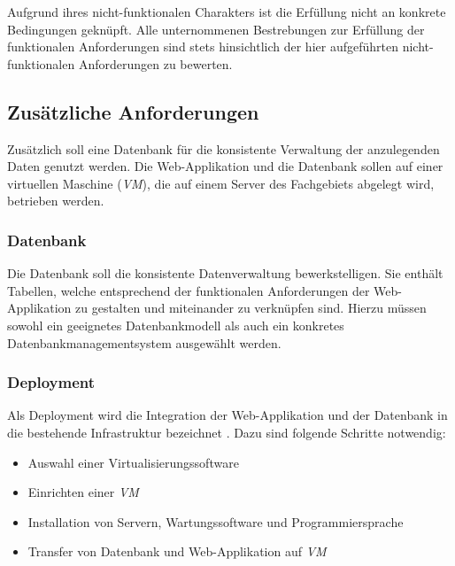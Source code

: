 \documentclass[
]{article}
\providecommand{\tightlist}{%
  \setlength{\itemsep}{0pt}\setlength{\parskip}{0pt}}
\begin{document}
Aufgrund ihres nicht-funktionalen Charakters ist die Erfüllung nicht an konkrete Bedingungen geknüpft. Alle unternommenen Bestrebungen zur Erfüllung der funktionalen Anforderungen sind stets hinsichtlich der hier aufgeführten nicht-funktionalen Anforderungen zu bewerten.

\hypertarget{zusuxe4tzliche-anforderungen}{%
\subsection{Zusätzliche Anforderungen}\label{zusuxe4tzliche-anforderungen}}

Zusätzlich soll eine Datenbank für die konsistente Verwaltung der anzulegenden Daten genutzt werden. Die Web-Applikation und die Datenbank sollen auf einer virtuellen Maschine (\emph{VM}), die auf einem Server des Fachgebiets abgelegt wird, betrieben werden.

\hypertarget{datenbank}{%
\subsubsection{Datenbank}\label{datenbank}}

Die Datenbank soll die konsistente Datenverwaltung bewerkstelligen. Sie enthält Tabellen, welche entsprechend der funktionalen Anforderungen der Web-Applikation zu gestalten und miteinander zu verknüpfen sind. Hierzu müssen sowohl ein geeignetes Datenbankmodell als auch ein konkretes Datenbankmanagementsystem ausgewählt werden.

\hypertarget{deployment}{%
\subsubsection{Deployment}\label{deployment}}

Als Deployment wird die Integration der Web-Applikation und der Datenbank in die bestehende Infrastruktur bezeichnet \autocite[S.207ff]{Pitt2018}. Dazu sind folgende Schritte notwendig:

\begin{itemize}
\tightlist
\item
  Auswahl einer Virtualisierungssoftware
\item
  Einrichten einer \emph{VM}
\item
  Installation von Servern, Wartungssoftware und Programmiersprache
\item
  Transfer von Datenbank und Web-Applikation auf \emph{VM}
\end{itemize}
\end{document}
